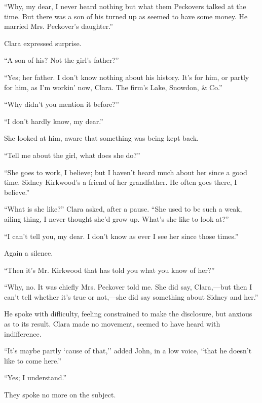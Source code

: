 ``Why, my dear, I never heard nothing but what them Peckovers talked at
the time. But there was a son of his turned up as seemed to have some
money. He married Mrs. Peckover's daughter.''

Clara expressed surprise.

``A son of his? Not the girl's father?''

``Yes; her father. I don't know nothing about his history. It's for him,
or partly for {}him, as I'm workin' now, Clara. The firm's Lake,
Snowdon, \& Co.''

``Why didn't you mention it before?''

``I don't hardly know, my dear.''

She looked at him, aware that something was being kept back.

``Tell me about the girl, what does she do?''

``She goes to work, I believe; but I haven't heard much about her since
a good time. Sidney Kirkwood's a friend of her grandfather. He often
goes there, I believe.''

``What is she like?'' Clara asked, after a pause. ``She used to be such
a weak, ailing thing, I never thought she'd grow up. What's she like to
look at?''

``I can't tell you, my dear. I don't know as ever I see her since those
times.''

Again a silence.

``Then it's Mr. Kirkwood that has told you what you know of her?''

``Why, no. It was chiefly Mrs. Peckover told me. She did say,
Clara,---but then I can't tell whether it's true or not,---she did say
something about Sidney and her.''

He spoke with difliculty, feeling constrained {}to make the disclosure,
but anxious as to its result. Clara made no movement, seemed to have
heard with indifference.

``It's maybe partly `cause of that,'' added John, in a low voice, ``that
he doesn't like to come here.''

``Yes; I understand.''

They spoke no more on the subject.

